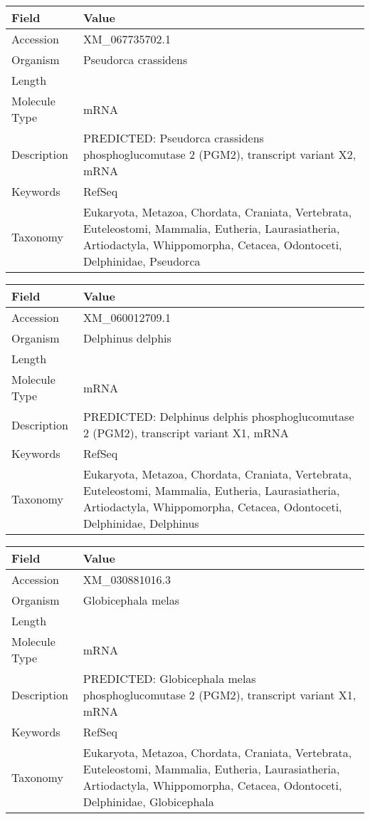 \documentclass[10pt]{article}
\begin{document}
{\footnotesize
\begin{longtable}{>{\raggedright\arraybackslash}p{4.5cm} >{\raggedright\arraybackslash}p{11.5cm}}
\textbf{Field} & \textbf{Value} \\
\hline
Accession & XM\_067735702.1 \\
Organism & Pseudorca crassidens \\
Length & 12582 \\
Molecule Type & mRNA \\
Description & PREDICTED: Pseudorca crassidens phosphoglucomutase 2 (PGM2), transcript variant X2, mRNA \\
Keywords & RefSeq \\
Taxonomy & Eukaryota, Metazoa, Chordata, Craniata, Vertebrata, Euteleostomi, Mammalia, Eutheria, Laurasiatheria, Artiodactyla, Whippomorpha, Cetacea, Odontoceti, Delphinidae, Pseudorca \\
\end{longtable}
}

{\footnotesize
\begin{longtable}{>{\raggedright\arraybackslash}p{4.5cm} >{\raggedright\arraybackslash}p{11.5cm}}
\textbf{Field} & \textbf{Value} \\
\hline
Accession & XM\_060012709.1 \\
Organism & Delphinus delphis \\
Length & 6792 \\
Molecule Type & mRNA \\
Description & PREDICTED: Delphinus delphis phosphoglucomutase 2 (PGM2), transcript variant X1, mRNA \\
Keywords & RefSeq \\
Taxonomy & Eukaryota, Metazoa, Chordata, Craniata, Vertebrata, Euteleostomi, Mammalia, Eutheria, Laurasiatheria, Artiodactyla, Whippomorpha, Cetacea, Odontoceti, Delphinidae, Delphinus \\
\end{longtable}
}

{\footnotesize
\begin{longtable}{>{\raggedright\arraybackslash}p{4.5cm} >{\raggedright\arraybackslash}p{11.5cm}}
\textbf{Field} & \textbf{Value} \\
\hline
Accession & XM\_030881016.3 \\
Organism & Globicephala melas \\
Length & 6886 \\
Molecule Type & mRNA \\
Description & PREDICTED: Globicephala melas phosphoglucomutase 2 (PGM2), transcript variant X1, mRNA \\
Keywords & RefSeq \\
Taxonomy & Eukaryota, Metazoa, Chordata, Craniata, Vertebrata, Euteleostomi, Mammalia, Eutheria, Laurasiatheria, Artiodactyla, Whippomorpha, Cetacea, Odontoceti, Delphinidae, Globicephala \\
\end{longtable}
}
\end{document}
